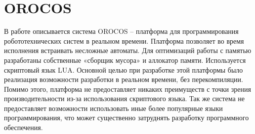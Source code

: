 \section{OROCOS}

В работе \cite{klotzbucher2010orocos}  описывается система OROCOS – платформа 
для программирования робототехнических систем в реальном времени. Платформа 
позволяет во время исполнения встраивать несложные автоматы. Для оптимизаций 
работы с памятью разработаны собственные «сборщик мусора» и аллокатор памяти. 
Используется скриптовый язык LUA. Основной целью при разработке этой платформы 
было реализация возможности разработки в реальном времени, без перекомпиляции. 
Помимо этого, платформа не предоставляет никаких преимуществ с точки зрения 
производительности из-за использования скриптового языка. Так же система не 
предоставляет возможности использовать иные более популярные языки 
программирования, что может существенно затруднять разработку программного 
обеспечения.